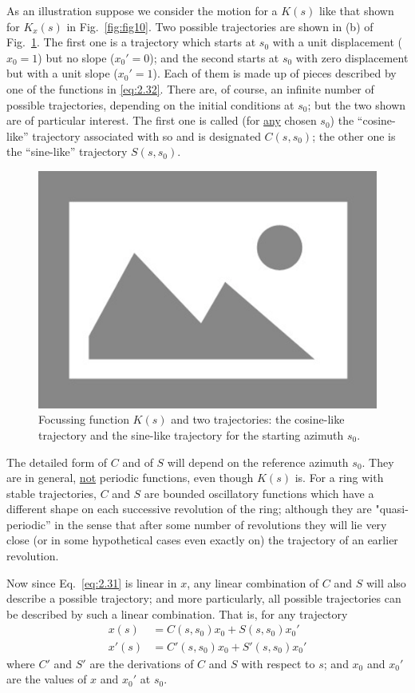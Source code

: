 As an illustration suppose we consider the motion for a $K(s)$ like that shown for $K_x(s)$ in Fig.~\ref{fig:fig10}. Two possible trajectories are shown in (b) of Fig.~\ref{fig:fig11}. The first one is a trajectory which starts at $s_0$ with a unit displacement ($x_0 = 1$) but no slope ($x_0' = 0$); and the second starts at $s_0$ with zero displacement but with a unit slope ($x_0' = 1$). Each of them is made up of pieces described by one of the functions in \eqref{eq:2.32}. There are, of course, an infinite number of possible trajectories, depending on the initial conditions at $s_0$; but the two shown are of particular interest. The first one is called (for \underline{any} chosen $s_0$) the “cosine-like” trajectory associated with so and is designated $C(s,s_0)$; the other one is the “sine-like” trajectory $S(s,s_0)$.

\begin{figure}[!htb]
	\centering
	\includegraphics[width=0.7\linewidth]{./Figuras/placeholder.png}
	\caption{Focussing function $K(s)$ and two trajectories: the cosine-like trajectory and the sine-like trajectory for the starting azimuth $s_0$.}
	\label{fig:fig11}
\end{figure}

The detailed form of $C$ and of $S$ will depend on the reference azimuth $s_0$. They are in general, \underline{not} periodic functions, even though $K(s)$ is. For a ring with stable trajectories, $C$ and $S$ are bounded oscillatory functions which have a different shape on each successive revolution of the ring; although they are "quasi-periodic” in the sense that after some number of revolutions they will lie very close (or in some hypothetical cases even exactly on) the trajectory of an earlier revolution.

Now since Eq.~\eqref{eq:2.31} is linear in $x$, any linear combination of $C$ and $S$ will also describe a possible trajectory; and more particularly, all possible trajectories can be described by such a linear combination. That is, for any trajectory
\begin{align}
	x(s) &= C(s,s_0)x_0 + S(s,s_0)x_0'\\
	x'(s) &= C'(s,s_0)x_0 + S'(s,s_0)x_0'
\end{align}
where $C'$ and $S'$ are the derivations of $C$ and $S$ with respect to $s$; and $x_0$ and $x_0'$ are the values of $x$ and $x_0'$ at $s_0$.

